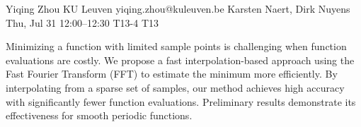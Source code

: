 \begin{talk}
  {Yiqing Zhou}%
  {KU Leuven}%
  {yiqing.zhou@kuleuven.be}%
  {Karsten Naert, Dirk Nuyens}%
  {}%
  {}%
  {Thu, Jul 31 12:00–12:30}%
  {T13-4}%
  {T13}%
  
				
			
Minimizing a function with limited sample points is challenging when function evaluations are costly. We propose a fast interpolation-based approach using the Fast Fourier Transform (FFT) to estimate the minimum more efficiently. By interpolating from a sparse set of samples, our method achieves high accuracy with significantly fewer function evaluations. Preliminary results demonstrate its effectiveness for smooth periodic functions.
\end{talk}

